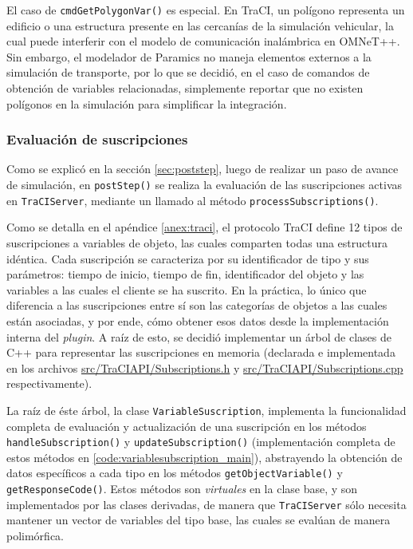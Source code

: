 El caso de \texttt{cmdGetPolygonVar()} es especial. En TraCI, un polígono representa un edificio o una estructura presente en las cercanías de la simulación vehicular, la cual puede interferir con el modelo de comunicación inalámbrica en OMNeT++. Sin embargo, el modelador de Paramics no maneja elementos externos a la simulación de transporte, por lo que se decidió, en el caso de comandos de obtención de variables relacionadas, simplemente reportar que no existen polígonos en la simulación para simplificar la integración.


\subsubsection{Evaluación de suscripciones}\label{sec:subs}

Como se explicó en la sección \ref{sec:poststep}, luego de realizar un paso de avance de simulación, en \texttt{postStep()} se realiza la evaluación de las suscripciones activas en \texttt{TraCIServer}, mediante un llamado al método \texttt{processSubscriptions()}.

Como se detalla en el apéndice \ref{anex:traci}, el protocolo TraCI define 12 tipos de suscripciones a variables de objeto, las cuales comparten todas una estructura idéntica. Cada suscripción se caracteriza por su identificador de tipo y sus parámetros: tiempo de inicio, tiempo de fin, identificador del objeto y las variables a las cuales el cliente se ha suscrito. En la práctica, lo único que diferencia a las suscripciones entre sí son las categorías de objetos a las cuales están asociadas, y por ende, cómo obtener esos datos desde la implementación interna del \emph{plugin}. A raíz de esto, se decidió implementar un árbol de clases de C++ para representar las suscripciones en memoria (declarada e implementada en los archivos \href{https://github.com/molguin92/paramics_traci/blob/master/src/TraCIAPI/Subscriptions.h}{src/TraCIAPI/Subscriptions.h} y \href{https://github.com/molguin92/paramics_traci/blob/master/src/TraCIAPI/Subscriptions.cpp}{src/TraCIAPI/Subscriptions.cpp} respectivamente).

La raíz de éste árbol, la clase \texttt{VariableSuscription}, implementa la funcionalidad completa de evaluación y actualización de una suscripción en los métodos \texttt{handleSubscription()} y \texttt{updateSubscription()} (implementación completa de estos métodos en \ref{code:variablesubscription_main}), abstrayendo la obtención de datos específicos a cada tipo en los métodos \texttt{getObjectVariable()} y \texttt{getResponseCode()}. Estos métodos son \emph{virtuales} en la clase base, y son implementados por las clases derivadas, de manera que \texttt{TraCIServer} sólo necesita mantener un vector de variables del tipo base, las cuales se evalúan de manera polimórfica.

